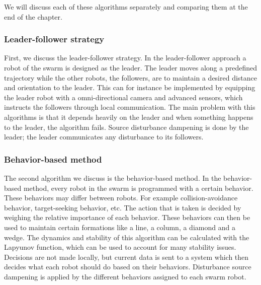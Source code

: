 We will discuss each of these algorithms separately and comparing them at the end of the chapter.

\subsubsection{Leader-follower strategy}
First, we discuss the leader-follower strategy. 
In the leader-follower approach a robot of the swarm is designed as the leader.
The leader moves along a predefined trajectory while the other robots, the followers, are to maintain a desired distance and orientation to the leader. \cite{consolini2008leader}
This can for instance be implemented by equipping the leader robot with a omni-directional camera and advanced sensors, which instructs the followers through local communication. \cite{das2002vision}
The main problem with this algorithms is that it depends heavily on the leader and when something happens to the leader, the algorithm fails. 
Source disturbance dampening is done by the leader; the leader communicates any disturbance to its followers.

\subsubsection{Behavior-based method}
The second algorithm we discuss is the behavior-based method. 
In the behavior-based method, every robot in the swarm is programmed with a certain behavior. 
These behaviors may differ between robots.
For example collision-avoidance behavior, target-seeking behavior, etc. 
The action that is taken is decided by weighing the relative importance of each behavior. \cite{consolini2008leader}
These behaviors can then be used to maintain certain formations like a line, a column, a diamond and a wedge. \cite{balch1998behavior}
The dynamics and stability of this algorithm can be calculated with the Lapyunov function, which can be used to account for many stability issues. \cite{lawton2003decentralized}
Decisions are not made locally, but current data is sent to a system which then decides what each robot should do based on their behaviors.
Disturbance source dampening is applied by the different behaviors assigned to each swarm robot.

